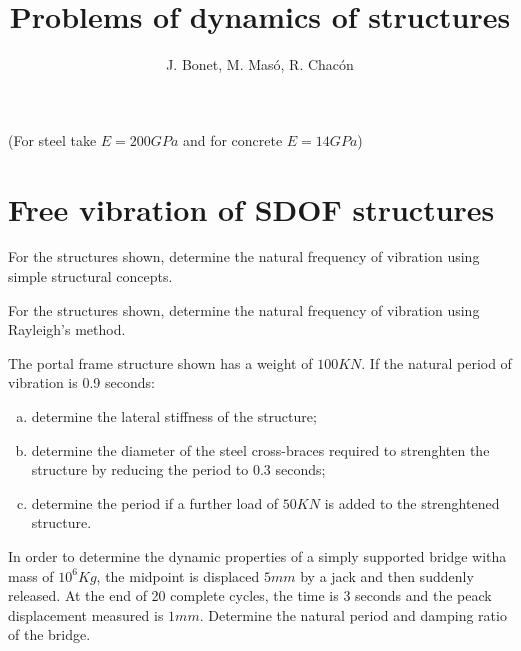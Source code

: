 \documentclass{problems}
\title{Problems of dynamics of structures}
\author{J. Bonet, M. Masó, R. Chacón}
\begin{document}
\maketitle

(For steel take $E=200GPa$ and for concrete $E=14GPa$)

\section{Free vibration of SDOF structures}

For the structures shown, determine the natural frequency of vibration using simple structural concepts.

\begin{center}
    \hspace{2em}
    \hspace{2em}
\end{center}


For the structures shown, determine the natural frequency of vibration using Rayleigh's method.

\begin{center}
\end{center}

\begin{center}
\end{center}


The portal frame structure shown has a weight of $100KN$. If the natural period of vibration is 0.9 seconds:
\begin{enumerate}[(a)]
    \item determine the lateral stiffness of the structure;
    \item determine the diameter of the steel cross-braces required to strenghten the structure by reducing the period to 0.3 seconds;
    \item determine the period if a further load of $50KN$ is added to the strenghtened structure.
\end{enumerate}

\begin{center}
\end{center}


In order to determine the dynamic properties of a simply supported bridge witha mass of $10^6Kg$, the midpoint is displaced $5mm$ by a jack and then suddenly released. At the end of 20 complete cycles, the time is 3 seconds and the peack displacement measured is $1mm$. Determine the natural period and damping ratio of the bridge.
\end{document}
